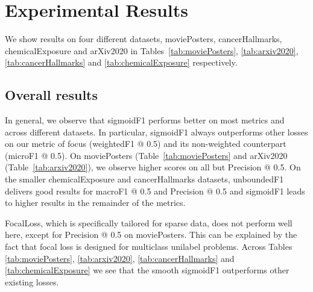 
\section{Experimental Results}
\label{sec:orgc23a664}

We show results on four different datasets, moviePosters, cancerHallmarks, chemicalExposure and arXiv2020 in Tables~\ref{tab:moviePosters}, \ref{tab:arxiv2020}, \ref{tab:cancerHallmarks} and \ref{tab:chemicalExposure} respectively. 

\subsection{Overall results}

In general, we observe that sigmoidF1 performs better on most metrics and across different datasets. In particular, sigmoidF1 always outperforms other losses on our metric of focus (weightedF1 @ 0.5) and its non-weighted counterpart (microF1 @ 0.5). On moviePosters (Table~\ref{tab:moviePosters} and arXiv2020 (Table~\ref{tab:arxiv2020}), we observe higher scores on all but Precision @ 0.5. On the smaller chemicalExposure and cancerHallmarks datasets, unboundedF1 delivers good results for macroF1 @ 0.5 and Precision @ 0.5 and sigmoidF1 leads to higher results in the remainder of the metrics.  

FocalLoss, which is specifically tailored for sparse data, does not perform well here, except for Precision @ 0.5 on moviePosters. This can be explained by the fact that focal loss is designed for multiclass unilabel problems. Across Tables \ref{tab:moviePosters}, \ref{tab:arxiv2020}, \ref{tab:cancerHallmarks} and \ref{tab:chemicalExposure} we see that the smooth sigmoidF1 outperforms other existing losses.

   

